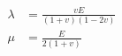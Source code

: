 \begin{equation} 
    \label{eq1}
    \begin{split}
        \lambda  &= \frac{{vE}}{{(1 + v)(1 - 2v)}}\\
        \mu  &= \frac{E}{{2(1 + v)}}
    \end{split}
    \end{equation}